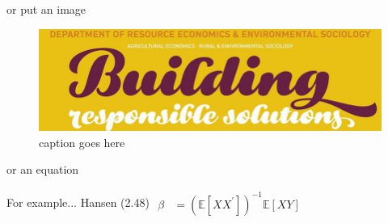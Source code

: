 \documentclass[
  9pt,
  ignorenonframetext,
  compress]{beamer}
\begin{document}
\begin{frame}{or put an image}
\protect\hypertarget{or-put-an-image}{}
\begin{figure}

{\centering \includegraphics[width=0.75\linewidth,height=0.75\textheight]{rees-feature-850} 

}

\caption{caption goes here}\label{fig:unnamed-chunk-2}
\end{figure}
\end{frame}

\begin{frame}{or an equation}
\protect\hypertarget{or-an-equation}{}
\begin{block}{For example... Hansen (2.48)} 
$\begin{aligned} \beta &=\left(\mathbb{E}\left[X X^{\prime}\right]\right)^{-1} \mathbb{E}[X Y] \end{aligned}$
\end{block}
\end{frame}
\end{document}
